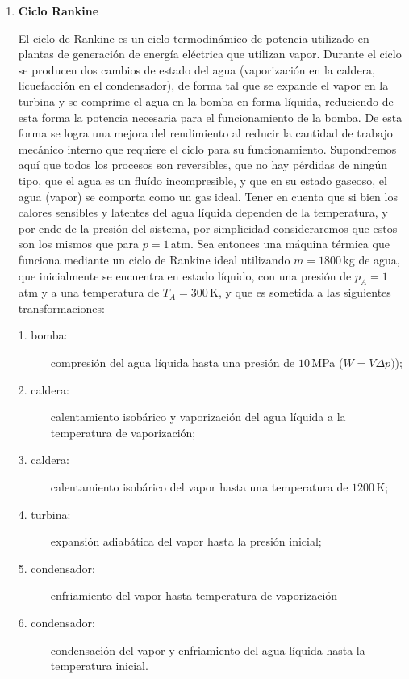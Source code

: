 \documentclass[a4paper,12pt]{article}
\begin{document}
\begin{enumerate}
	\item {\bf{Ciclo Rankine}}

		El ciclo de Rankine es un ciclo termodinámico de potencia utilizado en
		plantas de generación de energía eléctrica que utilizan vapor. Durante
		el ciclo se producen dos cambios de estado del agua (vaporización en la
		caldera, licuefacción en el condensador), de forma tal que se expande
		el vapor en la turbina y se comprime el agua en la bomba en forma
		líquida, reduciendo de esta forma la potencia necesaria para el
		funcionamiento de la bomba. De esta forma se logra una mejora del
		rendimiento al reducir la cantidad de trabajo mecánico interno que
		requiere el ciclo para su funcionamiento. Supondremos aquí que todos
		los procesos son reversibles, que no hay pérdidas de ningún tipo, que
		el agua es un fluído incompresible, y que en su estado gaseoso, el agua
		(vapor) se comporta como un gas ideal. Tener en cuenta que si bien los
		calores sensibles y latentes del agua líquida dependen de la
		temperatura, y por ende de la presión del sistema, por simplicidad
		consideraremos que estos son los mismos que para $p=1$\,atm. Sea
		entonces una máquina térmica que funciona mediante un ciclo de Rankine
		ideal utilizando $m=1800$\,kg de agua, que inicialmente se encuentra en
		estado líquido, con una presión de $p_A=1$\,atm y a una temperatura de
		$T_A=300$\,K, y que es sometida a las siguientes transformaciones: 

		\begin{description}
			\item[1. bomba:]compresión del agua líquida hasta una presión de
				$10$\,MPa ($W=V\Delta p)$);
			\item[2. caldera:] calentamiento isobárico y vaporización del agua
				líquida a la temperatura de vaporización;
			\item[3. caldera:] calentamiento isobárico del vapor hasta una
				temperatura de $1200$\,K;
			\item[4. turbina:] expansión adiabática del vapor hasta la presión
				inicial;
			\item[5. condensador:] enfriamiento del vapor hasta temperatura de
				vaporización
			\item[6. condensador:] condensación del vapor y enfriamiento del
				agua líquida hasta la temperatura inicial. 
		\end{description}
		

\end{enumerate}
\end{document}
